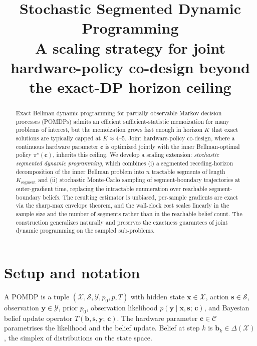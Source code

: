 \documentclass[11pt,a4paper]{article}
\title{Stochastic Segmented Dynamic Programming\\
       \large A scaling strategy for joint hardware-policy co-design beyond the exact-DP horizon ceiling}
\author{}
\date{}
\newcommand{\bc}{\bm{c}}
\newcommand{\bx}{\bm{x}}
\newcommand{\by}{\bm{y}}
\newcommand{\bs}{\bm{s}}
\newcommand{\bb}{\bm{b}}
\begin{document}
\maketitle

\begin{abstract}
Exact Bellman dynamic programming for partially observable Markov decision processes (POMDPs)
admits an efficient sufficient-statistic memoization for many problems of interest, but the
memoization grows fast enough in horizon $K$ that exact solutions are typically capped at
$K \approx 4$--$5$.  Joint hardware-policy co-design, where a continuous hardware parameter
$\bc$ is optimized jointly with the inner Bellman-optimal policy $\pi^\star(\bc)$, inherits this
ceiling.  We develop a scaling extension: \emph{stochastic segmented dynamic programming},
which combines (i) a segmented receding-horizon decomposition of the inner Bellman problem
into $n$ tractable segments of length $K_\mathrm{segment}$ and (ii) stochastic Monte-Carlo
sampling of segment-boundary trajectories at outer-gradient time, replacing the intractable
enumeration over reachable segment-boundary beliefs.  The resulting estimator is unbiased,
per-sample gradients are exact via the sharp-max envelope theorem, and the wall-clock cost
scales linearly in the sample size and the number of segments rather than in the reachable
belief count.  The construction generalizes naturally and preserves the exactness
guarantees of joint dynamic programming on the sampled sub-problems.
\end{abstract}

\tableofcontents

\section{Setup and notation}
\label{sec:setup}

A POMDP is a tuple $(\mathcal{X}, \mathcal{S}, \mathcal{Y}, p_0, p, T)$ with hidden state
$\bx \in \mathcal{X}$, action $\bs \in \mathcal{S}$, observation $\by \in \mathcal{Y}$,
prior $p_0$, observation likelihood $p(\by \mid \bx, \bs;\, \bc)$, and Bayesian belief
update operator $T(\bb, \bs, \by;\, \bc)$.  The hardware parameter $\bc \in \mathcal{C}$
parametrises the likelihood and the belief update.  Belief at step $k$ is
$\bb_k \in \Delta(\mathcal{X})$, the simplex of distributions on the state space.
\end{document}
